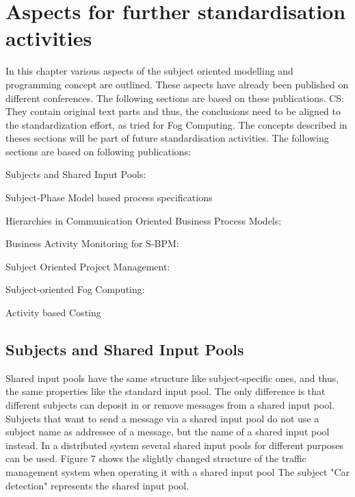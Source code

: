 \chapter{Aspects for further standardisation activities}


In this chapter various aspects of the subject oriented modelling and programming concept are outlined. These aspects have already been published on different conferences. The following sections are based on these publications. CS: They contain original text parts and thus, the conclusions need to be aligned to the standardization effort, as tried for Fog Computing.
The concepts described in theses sections will be part of future standardisation activities.
The following sections are based on following publications:\\
\begin{list}{-}
	\item Subjects and Shared Input Pools: \cite{article:SharedInputPool}
	\item Subject-Phase Model based process specifications \cite{article:SubjectPhase}
	\item Hierarchies in Communication Oriented Business Process Models: \cite{article:Subject-hierarchies}
	\item Business Activity Monitoring for S-BPM: \cite{article:SubProcessMon}
	\item Subject Oriented Project Management: \cite{article:Subject-Oriented-Project-Management}
	\item Subject-oriented Fog Computing: \cite{article:FogComp}
	\item Activity based Costing \cite{article:SBPMCosting}
\end{list}

\section{Subjects and Shared Input Pools}

Shared input pools have the same structure like subject-specific ones, and thus, the same properties like the standard input pool. The only difference is that different subjects can deposit in or remove messages from a shared input pool. Subjects that want to send a message via a shared input pool do not use a subject name as addressee of a message, but the name of a shared input pool instead. In a distributed system several shared input pools for different purposes can be used. Figure 7 shows the slightly changed structure of the traffic management system when operating it with a shared input pool  The subject "Car detection" represents the shared input pool.


